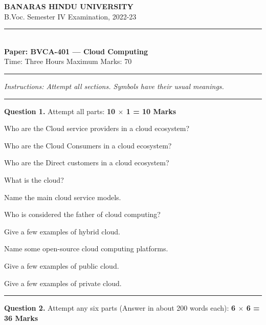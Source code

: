 \documentclass[11pt,a4paper]{article}
\begin{document}
\begin{center}
  {\large\bfseries BANARAS HINDU UNIVERSITY}\\[2pt]
  {\normalsize B.Voc. Semester IV Examination, 2022-23}\\[6pt]
  \rule{0.8\linewidth}{0.5pt}\\[6pt]
  {\large\bfseries Paper: BVCA-401 --- Cloud Computing}\\[4pt]
  {\normalsize Time: Three Hours \hfill Maximum Marks: 70}
\end{center}

\rule{\linewidth}{0.4pt}

\smallskip



\noindent   \textit{Instructions: Attempt all sections. Symbols have their usual meanings.}

\bigskip




\rule{\linewidth}{0.4pt}\smallskip




\noindent   \textbf{Question 1.} Attempt all parts: \hfill   \textbf{10 $ \times$ 1 = 10 Marks}

\begin{parts}
  \item Who are the Cloud service providers in a cloud ecosystem?
  \item Who are the Cloud Consumers in a cloud ecosystem?
  \item Who are the Direct customers in a cloud ecosystem?
  \item What is the cloud?
  \item Name the main cloud service models.
  \item Who is considered the father of cloud computing?
  \item Give a few examples of hybrid cloud.
  \item Name some open-source cloud computing platforms.
  \item Give a few examples of public cloud.
  \item Give a few examples of private cloud.
\end{parts}

\bigskip


\rule{\linewidth}{0.4pt}\smallskip




\noindent   \textbf{Question 2.} Attempt any six parts (Answer in about 200 words each): \hfill   \textbf{6 $ \times$ 6 = 36 Marks}
\end{document}
